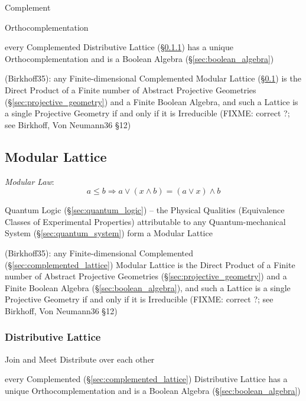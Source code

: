 Complement

Orthocomplementation

every Complemented Distributive Lattice (\S\ref{sec:distributive_lattice}) has a
unique Orthocomplementation and is a Boolean Algebra
(\S\ref{sec:boolean_algebra})

(Birkhoff35): any Finite-dimensional Complemented Modular Lattice
(\S\ref{sec:modular_lattice}) is the Direct Product of a Finite number of
Abstract Projective Geometries (\S\ref{sec:projective_geometry}) and a Finite
Boolean Algebra, and such a
Lattice is a single Projective Geometry if and only if it is Irreducible
(FIXME: correct ?; see Birkhoff, Von Neumann36 \S 12)



\subsection{Modular Lattice}\label{sec:modular_lattice}

\emph{Modular Law}:
\[
  a \leq b \Rightarrow a \vee (x \wedge b) = (a \vee x) \wedge b
\]

Quantum Logic (\S\ref{sec:quantum_logic}) -- the Physical Qualities (Equivalence
Classes of Experimental Properties) attributable to any Quantum-mechanical
System (\S\ref{sec:quantum_system}) form a Modular Lattice

(Birkhoff35): any Finite-dimensional Complemented
(\S\ref{sec:complemented_lattice}) Modular Lattice is the Direct Product of a
Finite number of Abstract Projective Geometries
(\S\ref{sec:projective_geometry}) and a Finite Boolean Algebra
(\S\ref{sec:boolean_algebra}), and such a
Lattice is a single Projective Geometry if and only if it is Irreducible
(FIXME: correct ?; see Birkhoff, Von Neumann36 \S 12)



\subsubsection{Distributive Lattice}\label{sec:distributive_lattice}

Join and Meet Distribute over each other

every Complemented (\S\ref{sec:complemented_lattice}) Distributive Lattice has a
unique Orthocomplementation and is a Boolean Algebra
(\S\ref{sec:boolean_algebra})




